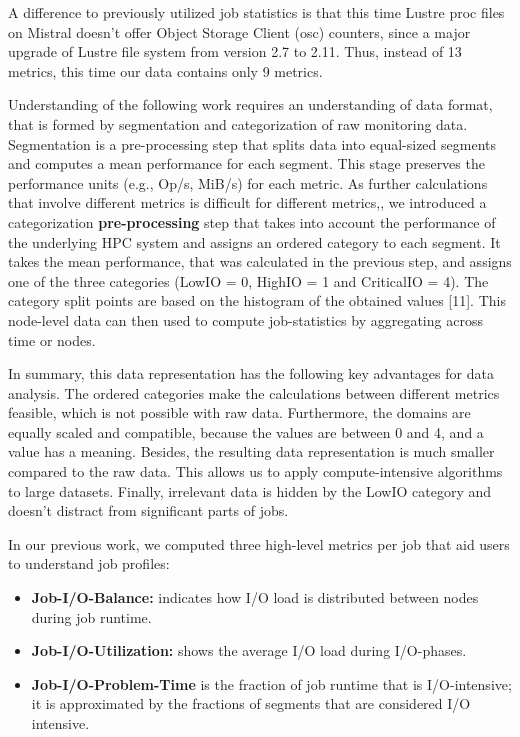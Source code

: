 \documentclass[]{llncs}
\begin{document}
A difference to previously utilized job statistics is that this time Lustre proc files on Mistral doesn’t offer Object Storage Client (osc) counters, since a major upgrade of Lustre file system from version 2.7 to 2.11.
Thus, instead of 13 metrics, this time our data contains only 9 metrics.

Understanding of the following work requires an understanding of data format, that is formed by segmentation and categorization of raw monitoring data.
Segmentation is a pre-processing step that splits data into equal-sized segments and computes a mean performance for each segment.
This stage preserves the performance units (e.g., Op/s, MiB/s) for each metric.
As further calculations that involve different metrics is difficult for different metrics,, we introduced a categorization\textbf{ pre-processing} step that takes into account the performance of the underlying HPC system and assigns an ordered category to each segment.
It takes the mean performance, that was calculated in the previous step, and assigns one of the three categories (LowIO = 0, HighIO = 1 and CriticalIO = 4).
The category split points are based on the histogram of the obtained values [11].
This node-level data can then used to compute job-statistics by aggregating across time or nodes.

In summary, this data representation has the following key advantages for data analysis.
The ordered categories make the calculations between different metrics feasible, which is not possible with raw data.
Furthermore, the domains are equally scaled and compatible, because the values are between 0 and 4, and a value has a meaning.
Besides, the resulting data representation is much smaller compared to the raw data.
This allows us to apply compute-intensive algorithms to large datasets.
Finally, irrelevant data is hidden by the LowIO category and doesn’t distract from significant parts of jobs.

In our previous work, we computed three high-level metrics per job that aid users to understand job profiles: 

\begin{itemize}
 \item \textbf{Job-I/O-Balance:} indicates how I/O load is distributed between nodes during job runtime.
 \item \textbf{Job-I/O-Utilization:} shows the average I/O load during I/O-phases.
 \item \textbf{Job-I/O-Problem-Time} is the fraction of job runtime that is I/O-intensive; it is approximated by the fractions of segments that are considered I/O intensive.
\end{itemize}
\end{document}
